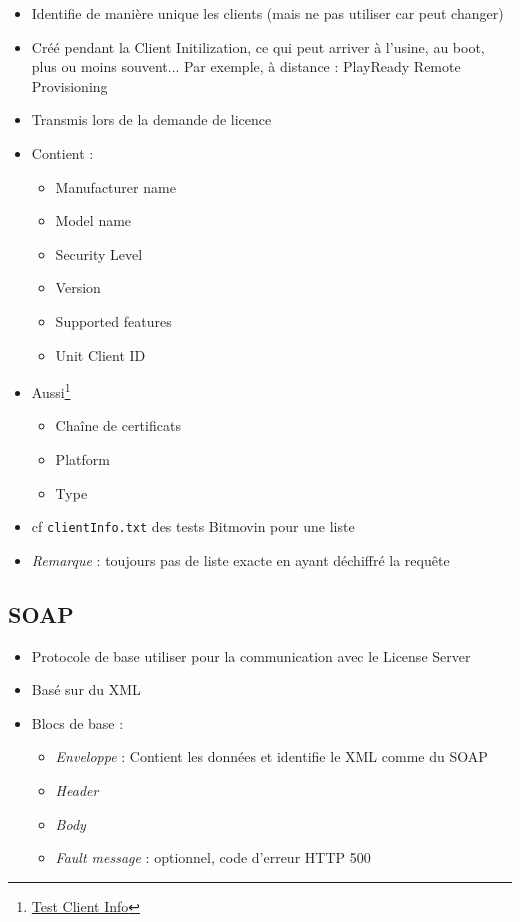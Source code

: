 \documentclass[french]{article}
\begin{document}
\begin{itemize}
	\item Identifie de manière unique les clients (mais ne pas utiliser car peut changer)
	\item Créé pendant la Client Initilization, ce qui peut arriver à l'usine, au boot, plus ou moins souvent... Par exemple, à distance : PlayReady Remote Provisioning
	\item Transmis lors de la demande de licence
	
	\item Contient :
	\begin{itemize}
		\item Manufacturer name
		\item Model name
		\item Security Level
		\item Version
		\item Supported features
		\item Unit Client ID
	\end{itemize}
	
	\item Aussi\footnote{\href{https://testweb.playready.microsoft.com/Doc/TestingClientInfo}{Test Client Info}}
	\begin{itemize}
		\item Chaîne de certificats
		\item Platform
		\item Type
	\end{itemize}
	
	\item cf \texttt{clientInfo.txt} des tests Bitmovin pour une liste
	\item \emph{Remarque} : toujours pas de liste exacte en ayant déchiffré la requête
	
	
\end{itemize}


\subsection{SOAP}

\begin{itemize}
	\item Protocole de base utiliser pour la communication avec le License Server
	\item Basé sur du XML
	\item Blocs de base :
	\begin{itemize}
		\item \emph{Enveloppe} : Contient les données et identifie le XML comme du SOAP
		\item \emph{Header}
		\item \emph{Body}
		\item \emph{Fault message} : optionnel, code d'erreur HTTP 500
	\end{itemize}
\end{itemize}
\end{document}
